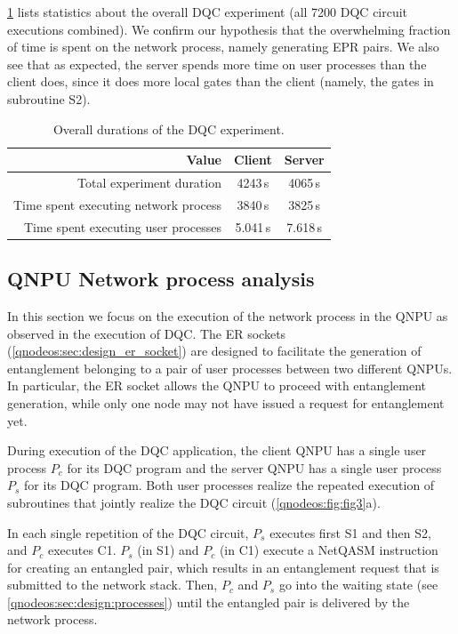 \cref{tab:exp_durations} lists statistics about the overall \ac{DQC} experiment (all 7200 \ac{DQC} circuit executions combined). We confirm our hypothesis that the overwhelming fraction of time is spent on the network process, namely generating \ac{EPR} pairs. We also see that as expected, the server spends more time on user processes than the client does, since it does more local gates than the client (namely, the gates in subroutine S2).

\begin{table}[t]
    \centering
    \begin{tabular}{|r|c|c|}
    \hline
    \textbf{Value} & \textbf{Client} & \textbf{Server} \\ 
    \hline
    Total experiment duration & 4243\,s & 4065\,s \\
    Time spent executing network process & 3840\,s & 3825\,s \\
    Time spent executing user processes & 5.041\,s & 7.618\,s \\
    \hline
    \end{tabular}
    \caption{Overall durations of the \ac{DQC} experiment.}
    \label{tab:exp_durations}
\end{table}

\subsection{QNPU Network process analysis}

In this section we focus on the execution of the network process in the \ac{QNPU} as observed in the execution of \ac{DQC}. The \ac{ER} sockets (\cref{qnodeos:sec:design_er_socket}) are designed to facilitate the generation of entanglement belonging to a pair of user processes between two different \acp{QNPU}. In particular, the \ac{ER} socket allows the \ac{QNPU} to proceed with entanglement generation, while only one node may not have issued a request for entanglement yet. 

During execution of the \ac{DQC} application, the client \ac{QNPU} has a single user process $P_c$ for its \ac{DQC} program and the server \ac{QNPU} has a single user process $P_s$ for its \ac{DQC} program. Both user processes realize the repeated execution of subroutines that jointly realize the \ac{DQC} circuit (\cref{qnodeos:fig:fig3}a).

In each single repetition of the \ac{DQC} circuit, $P_s$ executes first S1 and then S2, and $P_c$ executes C1. $P_s$ (in S1) and $P_c$ (in C1) execute a \ac{NetQASM} instruction for creating an entangled pair, which results in an entanglement request that is submitted to the network stack. Then, $P_c$ and $P_s$ go into the waiting state (see \cref{qnodeos:sec:design:processes}) until the entangled pair is delivered by the network process.

